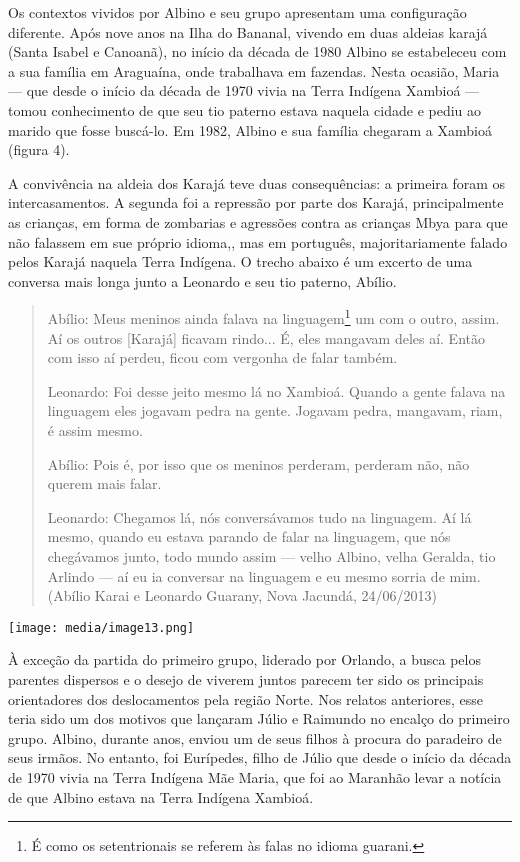 Os contextos vividos por Albino e seu grupo apresentam uma configuração
diferente. Após nove anos na Ilha do Bananal, vivendo em duas aldeias
karajá (Santa Isabel e Canoanã), no início da década de 1980 Albino se
estabeleceu com a sua família em Araguaína, onde trabalhava em fazendas.
Nesta ocasião, Maria --- que desde o início da década de 1970 vivia na
Terra Indígena Xambioá --- tomou conhecimento de que seu tio paterno
estava naquela cidade e pediu ao marido que fosse buscá-lo. Em 1982,
Albino e sua família chegaram a Xambioá (figura 4).

A convivência na aldeia dos Karajá teve duas consequências: a primeira
foram os intercasamentos. A segunda foi a repressão por parte dos
Karajá, principalmente as crianças, em forma de zombarias e agressões
contra as crianças Mbya para que não falassem em sue próprio idioma,,
mas em português, majoritariamente falado pelos Karajá naquela Terra
Indígena. O trecho abaixo é um excerto de uma conversa mais longa junto
a Leonardo e seu tio paterno, Abílio.

\begin{quote}
Abílio: Meus meninos ainda falava na linguagem\footnote{É como os
  setentrionais se referem às falas no idioma guarani.} um com o outro,
assim. Aí os outros {[}Karajá{]} ficavam rindo... É, eles mangavam deles
aí. Então com isso aí perdeu, ficou com vergonha de falar também.

Leonardo: Foi desse jeito mesmo lá no Xambioá. Quando a gente falava na
linguagem eles jogavam pedra na gente. Jogavam pedra, mangavam, riam, é
assim mesmo.

Abílio: Pois é, por isso que os meninos perderam, perderam não, não
querem mais falar.

Leonardo: Chegamos lá, nós conversávamos tudo na linguagem. Aí lá mesmo,
quando eu estava parando de falar na linguagem, que nós chegávamos
junto, todo mundo assim --- velho Albino, velha Geralda, tio Arlindo ---
aí eu ia conversar na linguagem e eu mesmo sorria de mim. (Abílio Karai
e Leonardo Guarany, Nova Jacundá, 24/06/2013)
\end{quote}

\texttt{[image: media/image13.png]}

À exceção da partida do primeiro grupo, liderado por Orlando, a busca
pelos parentes dispersos e o desejo de viverem juntos parecem ter sido
os principais orientadores dos deslocamentos pela região Norte. Nos
relatos anteriores, esse teria sido um dos motivos que lançaram Júlio e
Raimundo no encalço do primeiro grupo. Albino, durante anos, enviou um
de seus filhos à procura do paradeiro de seus irmãos. No entanto, foi
Eurípedes, filho de Júlio que desde o início da década de 1970 vivia na
Terra Indígena Mãe Maria, que foi ao Maranhão levar a notícia de que
Albino estava na Terra Indígena Xambioá.

